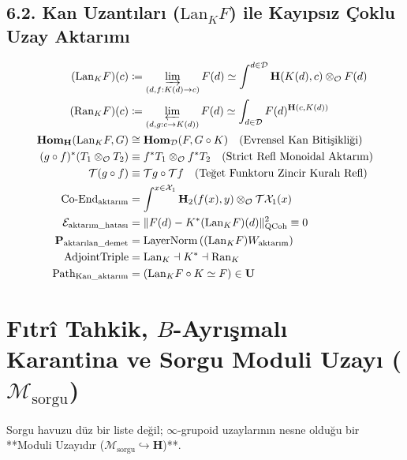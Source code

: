 \documentclass[11pt, a4paper]{article}
\begin{document}
\subsection{6.2. Kan Uzantıları ($\text{Lan}_K F$) ile Kayıpsız Çoklu Uzay Aktarımı}
\begin{align}
(\text{Lan}_K F)(c) &\coloneqq \varinjlim_{(d, f : K(d) \to c)} F(d) \simeq \int^{d \in \mathcal{D}} \mathbf{H}(K(d), c) \otimes_{\mathcal{O}} F(d) \\
(\text{Ran}_K F)(c) &\coloneqq \varprojlim_{(d, g : c \to K(d))} F(d) \simeq \int_{d \in \mathcal{D}} F(d)^{\mathbf{H}(c, K(d))} \\
\mathbf{Hom}_{\mathbf{H}}(\text{Lan}_K F, G) &\cong \mathbf{Hom}_{\mathcal{D}}(F, G \circ K) \quad (\text{Evrensel Kan Bitişikliği}) \\
(g \circ f)^*(T_1 \otimes_{\mathcal{O}} T_2) &\equiv f^* T_1 \otimes_{\mathcal{O}} f^* T_2 \quad (\text{Strict Refl Monoidal Aktarım}) \\
\mathcal{T}(g \circ f) &\equiv \mathcal{T}g \circ \mathcal{T}f \quad (\text{Teğet Funktoru Zincir Kuralı Refl}) \\
\text{Co-End}_{\text{aktarım}} &= \int^{x \in \mathcal{X}_1} \mathbf{H}_2(f(x), y) \otimes_{\mathcal{O}} \mathcal{T}\mathcal{X}_1(x) \\
\mathcal{E}_{\text{aktarım\_hatası}} &= \| F(d) - K^* (\text{Lan}_K F)(d) \|_{\text{QCoh}}^2 \equiv 0 \\
\mathbf{P}_{\text{aktarılan\_demet}} &= \text{LayerNorm}\left( (\text{Lan}_K F) W_{\text{aktarım}} \right) \\
\text{AdjointTriple} &= \text{Lan}_K \dashv K^* \dashv \text{Ran}_K \\
\text{Path}_{\text{Kan\_aktarım}} &= (\text{Lan}_K F \circ K \simeq F) \in \mathbf{U}
\end{align}

\section{Fıtrî Tahkik, $B$-Ayrışmalı Karantina ve Sorgu Moduli Uzayı ($\mathcal{M}_{\text{sorgu}}$)}

Sorgu havuzu düz bir liste değil; $\infty$-grupoid uzaylarının nesne olduğu bir **Moduli Uzayıdır ($\mathcal{M}_{\text{sorgu}} \hookrightarrow \mathbf{H}$)**.
\end{document}
